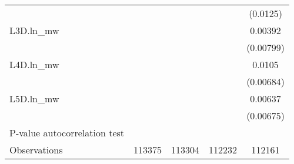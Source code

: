 {\begin{tabular}{l*{4}{c}}
          &                  &                  &                  & (0.0125)         \\
[1em]
L3D.ln_mw &                  &                  &                  &  0.00392         \\
          &                  &                  &                  &(0.00799)         \\
[1em]
L4D.ln_mw &                  &                  &                  &   0.0105         \\
          &                  &                  &                  &(0.00684)         \\
[1em]
L5D.ln_mw &                  &                  &                  &  0.00637         \\
          &                  &                  &                  &(0.00675)         \\
\hline
P-value autocorrelation test&                  &                  &                  &                  \\
Observations&   113375         &   113304         &   112232         &   112161         \\
\hline\hline
\end{tabular}
}
